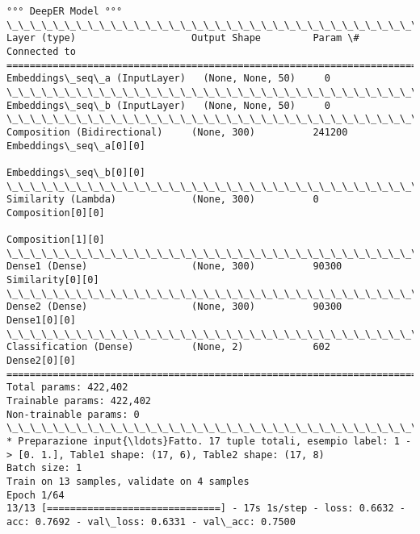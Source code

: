 \documentclass[11pt]{article}
\begin{document}
\begin{Verbatim}[commandchars=\\\{\}]
°°° DeepER Model °°°
\_\_\_\_\_\_\_\_\_\_\_\_\_\_\_\_\_\_\_\_\_\_\_\_\_\_\_\_\_\_\_\_\_\_\_\_\_\_\_\_\_\_\_\_\_\_\_\_\_\_\_\_\_\_\_\_\_\_\_\_\_\_\_\_\_\_\_\_\_\_\_\_\_\_\_\_\_\_\_\_\_\_\_\_\_\_\_\_\_\_\_\_\_\_\_\_\_\_
Layer (type)                    Output Shape         Param \#     Connected to                     
==================================================================================================
Embeddings\_seq\_a (InputLayer)   (None, None, 50)     0                                            
\_\_\_\_\_\_\_\_\_\_\_\_\_\_\_\_\_\_\_\_\_\_\_\_\_\_\_\_\_\_\_\_\_\_\_\_\_\_\_\_\_\_\_\_\_\_\_\_\_\_\_\_\_\_\_\_\_\_\_\_\_\_\_\_\_\_\_\_\_\_\_\_\_\_\_\_\_\_\_\_\_\_\_\_\_\_\_\_\_\_\_\_\_\_\_\_\_\_
Embeddings\_seq\_b (InputLayer)   (None, None, 50)     0                                            
\_\_\_\_\_\_\_\_\_\_\_\_\_\_\_\_\_\_\_\_\_\_\_\_\_\_\_\_\_\_\_\_\_\_\_\_\_\_\_\_\_\_\_\_\_\_\_\_\_\_\_\_\_\_\_\_\_\_\_\_\_\_\_\_\_\_\_\_\_\_\_\_\_\_\_\_\_\_\_\_\_\_\_\_\_\_\_\_\_\_\_\_\_\_\_\_\_\_
Composition (Bidirectional)     (None, 300)          241200      Embeddings\_seq\_a[0][0]           
                                                                 Embeddings\_seq\_b[0][0]           
\_\_\_\_\_\_\_\_\_\_\_\_\_\_\_\_\_\_\_\_\_\_\_\_\_\_\_\_\_\_\_\_\_\_\_\_\_\_\_\_\_\_\_\_\_\_\_\_\_\_\_\_\_\_\_\_\_\_\_\_\_\_\_\_\_\_\_\_\_\_\_\_\_\_\_\_\_\_\_\_\_\_\_\_\_\_\_\_\_\_\_\_\_\_\_\_\_\_
Similarity (Lambda)             (None, 300)          0           Composition[0][0]                
                                                                 Composition[1][0]                
\_\_\_\_\_\_\_\_\_\_\_\_\_\_\_\_\_\_\_\_\_\_\_\_\_\_\_\_\_\_\_\_\_\_\_\_\_\_\_\_\_\_\_\_\_\_\_\_\_\_\_\_\_\_\_\_\_\_\_\_\_\_\_\_\_\_\_\_\_\_\_\_\_\_\_\_\_\_\_\_\_\_\_\_\_\_\_\_\_\_\_\_\_\_\_\_\_\_
Dense1 (Dense)                  (None, 300)          90300       Similarity[0][0]                 
\_\_\_\_\_\_\_\_\_\_\_\_\_\_\_\_\_\_\_\_\_\_\_\_\_\_\_\_\_\_\_\_\_\_\_\_\_\_\_\_\_\_\_\_\_\_\_\_\_\_\_\_\_\_\_\_\_\_\_\_\_\_\_\_\_\_\_\_\_\_\_\_\_\_\_\_\_\_\_\_\_\_\_\_\_\_\_\_\_\_\_\_\_\_\_\_\_\_
Dense2 (Dense)                  (None, 300)          90300       Dense1[0][0]                     
\_\_\_\_\_\_\_\_\_\_\_\_\_\_\_\_\_\_\_\_\_\_\_\_\_\_\_\_\_\_\_\_\_\_\_\_\_\_\_\_\_\_\_\_\_\_\_\_\_\_\_\_\_\_\_\_\_\_\_\_\_\_\_\_\_\_\_\_\_\_\_\_\_\_\_\_\_\_\_\_\_\_\_\_\_\_\_\_\_\_\_\_\_\_\_\_\_\_
Classification (Dense)          (None, 2)            602         Dense2[0][0]                     
==================================================================================================
Total params: 422,402
Trainable params: 422,402
Non-trainable params: 0
\_\_\_\_\_\_\_\_\_\_\_\_\_\_\_\_\_\_\_\_\_\_\_\_\_\_\_\_\_\_\_\_\_\_\_\_\_\_\_\_\_\_\_\_\_\_\_\_\_\_\_\_\_\_\_\_\_\_\_\_\_\_\_\_\_\_\_\_\_\_\_\_\_\_\_\_\_\_\_\_\_\_\_\_\_\_\_\_\_\_\_\_\_\_\_\_\_\_
* Preparazione input{\ldots}Fatto. 17 tuple totali, esempio label: 1 -> [0. 1.], Table1 shape: (17, 6), Table2 shape: (17, 8)
Batch size: 1
Train on 13 samples, validate on 4 samples
Epoch 1/64
13/13 [==============================] - 17s 1s/step - loss: 0.6632 - acc: 0.7692 - val\_loss: 0.6331 - val\_acc: 0.7500


\end{Verbatim}
\end{document}

